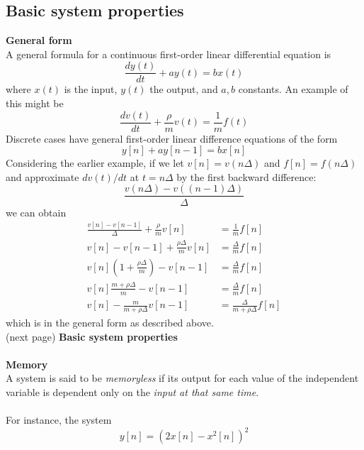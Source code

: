 \documentclass{report}
\begin{document}
\subsection{Basic system properties}
\textbf{General form}\\
A general formula for a continuous first-order linear differential equation is
\begin{equation*}
\frac{dy(t)}{dt}+ay(t)=bx(t)
\end{equation*}
where $x(t)$ is the input, $y(t)$ the output, and $a,b$ constants. An example of this might be
\begin{equation*}
\frac{dv(t)}{dt}+\frac{\rho}{m}v(t)=\frac{1}{m}f(t)
\end{equation*}
Discrete cases have general first-order linear difference equations of the form
\begin{equation*}
y[n]+ay[n-1]=bx[n]
\end{equation*}
Considering the earlier example, if we let $v[n]=v(n\Delta)$ and $f[n]=f(n\Delta)$ and approximate $dv(t)/dt$ at $t=n\Delta$ by
the first backward difference:
\begin{equation*}
\frac{v(n\Delta)-v((n-1)\Delta)}{\Delta}
\end{equation*}
we can obtain
\begin{align*}
\frac{v[n]-v[n-1]}{\Delta}+\frac{\rho}{m}v[n]&=\frac{1}{m}f[n]\\
v[n]-v[n-1]+\frac{\rho\Delta}{m}v[n]&=\frac{\Delta}{m}f[n]\\
v[n]\left(1+\frac{\rho\Delta}{m}\right)-v[n-1]&=\frac{\Delta}{m}f[n]\\
v[n]\frac{m+\rho\Delta}{m}-v[n-1]&=\frac{\Delta}{m}f[n]\\
v[n]-\frac{m}{m+\rho\Delta}v[n-1]&=\frac{\Delta}{m+\rho\Delta}f[n]
\end{align*}
which is in the general form as described above.\\
(next page)\newpage
\noindent\textbf{Basic system properties}\\
\vspace{1mm}\\
\textbf{Memory}\\
A system is said to be \textit{memoryless} if its output for each value of the independent variable is dependent
only on the \textit{input at that same time}.\\
\vspace{1mm}\\
For instance, the system 
\begin{equation*}
y[n]=(2x[n]-x^2[n])^2
\end{equation*}
\end{document}
